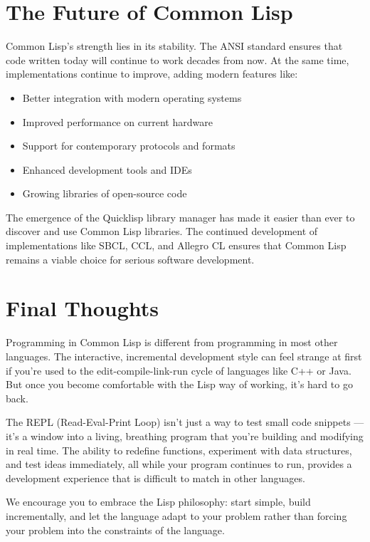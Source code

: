 \section*{The Future of Common Lisp}

Common Lisp's strength lies in its stability. The ANSI standard ensures that code written
today will continue to work decades from now. At the same time, implementations continue
to improve, adding modern features like:

\begin{itemize}
\item Better integration with modern operating systems
\item Improved performance on current hardware
\item Support for contemporary protocols and formats
\item Enhanced development tools and IDEs
\item Growing libraries of open-source code
\end{itemize}

The emergence of the Quicklisp library manager has made it easier than ever to discover
and use Common Lisp libraries. The continued development of implementations like SBCL,
CCL, and Allegro CL ensures that Common Lisp remains a viable choice for serious software
development.

\section*{Final Thoughts}

Programming in Common Lisp is different from programming in most other languages. The
interactive, incremental development style can feel strange at first if you're used to the
edit-compile-link-run cycle of languages like C++ or Java. But once you become comfortable with the Lisp way of working, it's hard to go back.

The REPL (Read-Eval-Print Loop) isn't just a way to test small code snippets --- it's a
window into a living, breathing program that you're building and modifying in real time.
The ability to redefine functions, experiment with data structures, and test ideas immediately, all while your program continues to run, provides a development experience that is
difficult to match in other languages.

We encourage you to embrace the Lisp philosophy: start simple, build incrementally, and
let the language adapt to your problem rather than forcing your problem into the constraints
of the language.

